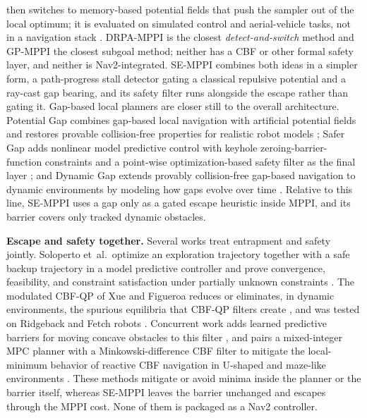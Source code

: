 \documentclass[journal]{IEEEtran}
\begin{document}
then switches to memory-based potential fields that push the sampler out of
the local optimum; it is evaluated on simulated control and aerial-vehicle
tasks, not in a navigation stack \cite{ma_mppi}. DRPA-MPPI is the closest
\emph{detect-and-switch} method and GP-MPPI the closest subgoal method;
neither has a CBF or other formal safety layer, and neither is
Nav2-integrated. SE-MPPI combines both ideas in a simpler form, a
path-progress stall detector gating a classical repulsive potential
\cite{khatib_apf} and a ray-cast gap bearing, and its safety filter runs
alongside the escape rather than gating it. Gap-based local planners are
closer still to the overall architecture. Potential Gap combines
gap-based local navigation with artificial potential fields and restores
provable collision-free properties for realistic robot models
\cite{potential_gap}; Safer Gap adds nonlinear model predictive control
with keyhole zeroing-barrier-function constraints and a point-wise
optimization-based safety filter as the final layer \cite{safer_gap}; and
Dynamic Gap extends provably collision-free gap-based navigation to
dynamic environments by modeling how gaps evolve over time
\cite{dynamic_gap}. Relative to this line, SE-MPPI uses a gap only as a
gated escape heuristic inside MPPI, and its barrier covers only tracked
dynamic obstacles.

\textbf{Escape and safety together.} Several works treat entrapment and
safety jointly. Soloperto et~al.\ optimize an exploration trajectory
together with a safe backup trajectory in a model predictive controller
and prove convergence, feasibility, and constraint satisfaction under
partially unknown constraints \cite{soloperto}. The modulated CBF-QP of
Xue and Figueroa reduces or eliminates, in dynamic environments, the
spurious equilibria that CBF-QP filters create \cite{reis_cbf_equilibria},
and was tested on Ridgeback and Fetch robots \cite{mcbf_qp}. Concurrent
work adds learned predictive barriers for moving concave obstacles to this
filter \cite{xue_proactive}, and pairs a mixed-integer MPC planner with a
Minkowski-difference CBF filter to mitigate the local-minimum behavior of
reactive CBF navigation in U-shaped and maze-like environments
\cite{chen_milp_cbf}. These methods mitigate or avoid minima inside the
planner or the barrier itself, whereas SE-MPPI leaves the barrier
unchanged and escapes through the MPPI cost. None of them is packaged as
a Nav2 controller.
\end{document}
